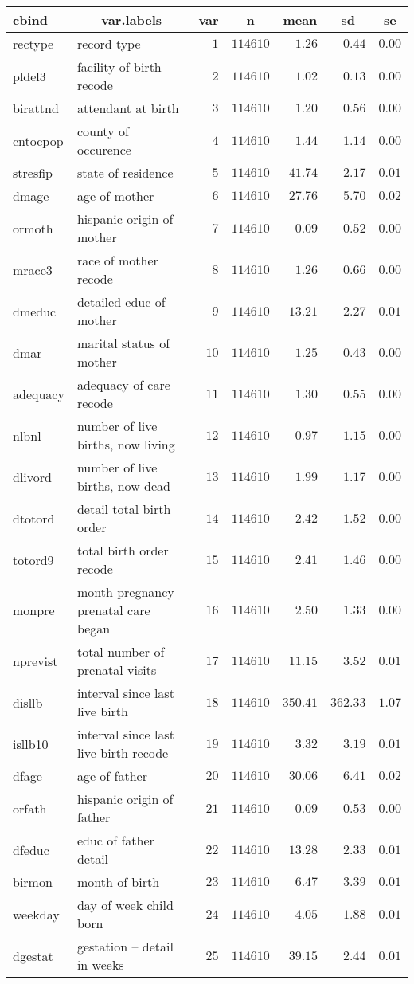 %

\setlongtables


\begin{longtable}{llrrrrr}
\hline\hline
\multicolumn{1}{l}{cbind}&\multicolumn{1}{c}{var.labels}&\multicolumn{1}{c}{var}&\multicolumn{1}{c}{n}&\multicolumn{1}{c}{mean}&\multicolumn{1}{c}{sd}&\multicolumn{1}{c}{se}\tabularnewline
\hline
\endhead
\hline
\endfoot
rectype&record type&$ 1$&$114610$&$   1.26$&$  0.44$&$0.00$\tabularnewline
pldel3&facility of birth recode&$ 2$&$114610$&$   1.02$&$  0.13$&$0.00$\tabularnewline
birattnd&attendant at birth&$ 3$&$114610$&$   1.20$&$  0.56$&$0.00$\tabularnewline
cntocpop&county of occurence&$ 4$&$114610$&$   1.44$&$  1.14$&$0.00$\tabularnewline
stresfip&state of residence&$ 5$&$114610$&$  41.74$&$  2.17$&$0.01$\tabularnewline
dmage&age of mother&$ 6$&$114610$&$  27.76$&$  5.70$&$0.02$\tabularnewline
ormoth&hispanic origin of mother&$ 7$&$114610$&$   0.09$&$  0.52$&$0.00$\tabularnewline
mrace3&race of mother recode&$ 8$&$114610$&$   1.26$&$  0.66$&$0.00$\tabularnewline
dmeduc&detailed educ of mother&$ 9$&$114610$&$  13.21$&$  2.27$&$0.01$\tabularnewline
dmar&marital status of mother&$10$&$114610$&$   1.25$&$  0.43$&$0.00$\tabularnewline
adequacy&adequacy of care recode&$11$&$114610$&$   1.30$&$  0.55$&$0.00$\tabularnewline
nlbnl&number of live births, now living&$12$&$114610$&$   0.97$&$  1.15$&$0.00$\tabularnewline
dlivord&number of live births, now dead&$13$&$114610$&$   1.99$&$  1.17$&$0.00$\tabularnewline
dtotord&detail total birth order&$14$&$114610$&$   2.42$&$  1.52$&$0.00$\tabularnewline
totord9&total birth order recode&$15$&$114610$&$   2.41$&$  1.46$&$0.00$\tabularnewline
monpre&month pregnancy prenatal care began&$16$&$114610$&$   2.50$&$  1.33$&$0.00$\tabularnewline
nprevist&total number of prenatal visits&$17$&$114610$&$  11.15$&$  3.52$&$0.01$\tabularnewline
disllb&interval since last live birth&$18$&$114610$&$ 350.41$&$362.33$&$1.07$\tabularnewline
isllb10&interval since last live birth recode&$19$&$114610$&$   3.32$&$  3.19$&$0.01$\tabularnewline
dfage&age of father&$20$&$114610$&$  30.06$&$  6.41$&$0.02$\tabularnewline
orfath&hispanic origin of father&$21$&$114610$&$   0.09$&$  0.53$&$0.00$\tabularnewline
dfeduc&educ of father detail&$22$&$114610$&$  13.28$&$  2.33$&$0.01$\tabularnewline
birmon&month of birth&$23$&$114610$&$   6.47$&$  3.39$&$0.01$\tabularnewline
weekday&day of week child born&$24$&$114610$&$   4.05$&$  1.88$&$0.01$\tabularnewline
dgestat&gestation -- detail in weeks&$25$&$114610$&$  39.15$&$  2.44$&$0.01$\tabularnewline

\end{longtable}
